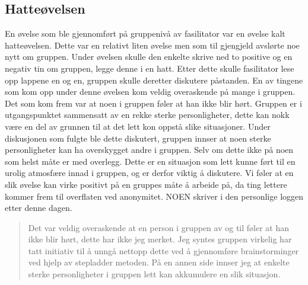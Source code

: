 \subsection{Hatteøvelsen}
En øvelse som ble gjennomført på gruppenivå av fasilitator var en øvelse kalt hatteøvelsen.  Dette var en relativt liten øvelse men som til gjengjeld avslørte noe nytt om gruppen. Under øvelsen skulle den enkelte skrive ned to positive og en negativ tin om gruppen, legge denne i en hatt. Etter dette skulle fasilitator lese opp lappene en og en, gruppen skulle deretter diskutere påstanden. 
En av tingene som kom opp under denne øvelsen kom veldig overaskende på mange i gruppen. Det som kom frem var at noen i gruppen føler at han ikke blir hørt. Gruppen er i utgangspunktet sammensatt av en rekke sterke personligheter, dette kan nokk være en del av grunnen til at det lett kon oppstå slike situasjoner. 
Under diskusjonen som fulgte ble dette diskutert, gruppen innser at noen sterke personligheter kan ha overskygget andre i gruppen. Selv om dette ikke på noen som helst måte er med overlegg. Dette er en situasjon som lett kunne ført til en urolig atmosfære innad i gruppen, og er derfor viktig å diskutere. Vi føler at en slik øvelse kan virke positivt på en gruppes måte å arbeide på, da ting lettere kommer frem til overflaten ved anonymitet. NOEN skriver i den personlige loggen etter denne dagen.
\begin{quote}
Det var veldig overaskende at en person i gruppen av og til føler at han ikke blir hørt, dette har ikke jeg merket. Jeg syntes gruppen virkelig har tatt initiativ til å unngå nettopp dette ved å gjennomføre brainstorminger ved hjelp av stepladder metoden. På en annen side innser jeg at enkelte sterke personligheter i gruppen lett kan akkumulere en slik situasjon. 
\end{quote}